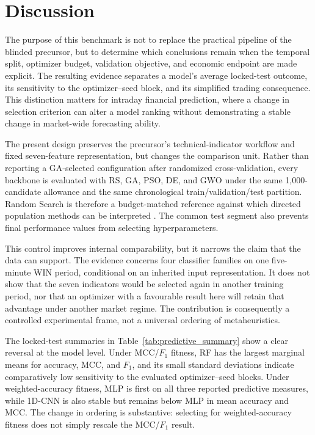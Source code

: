 \section{Discussion}\label{sec:discussion}

The purpose of this benchmark is not to replace the practical pipeline of the blinded precursor, but to determine which conclusions remain when the temporal split, optimizer budget, validation objective, and economic endpoint are made explicit. The resulting evidence separates a model's average locked-test outcome, its sensitivity to the optimizer--seed block, and its simplified trading consequence. This distinction matters for intraday financial prediction, where a change in selection criterion can alter a model ranking without demonstrating a stable change in market-wide forecasting ability.

The present design preserves the precursor's technical-indicator workflow and fixed seven-feature representation, but changes the comparison unit. Rather than reporting a GA-selected configuration after randomized cross-validation, every backbone is evaluated with RS, GA, PSO, DE, and GWO under the same 1,000-candidate allowance and the same chronological train/validation/test partition. Random Search is therefore a budget-matched reference against which directed population methods can be interpreted \cite{bergstra2012random_search}. The common test segment also prevents final performance values from selecting hyperparameters.

This control improves internal comparability, but it narrows the claim that the data can support. The evidence concerns four classifier families on one five-minute WIN period, conditional on an inherited input representation. It does not show that the seven indicators would be selected again in another training period, nor that an optimizer with a favourable result here will retain that advantage under another market regime. The contribution is consequently a controlled experimental frame, not a universal ordering of metaheuristics.


The locked-test summaries in Table~\ref{tab:predictive_summary} show a clear reversal at the model level. Under MCC/$F_1$ fitness, RF has the largest marginal means for accuracy, MCC, and $F_1$, and its small standard deviations indicate comparatively low sensitivity to the evaluated optimizer--seed blocks. Under weighted-accuracy fitness, MLP is first on all three reported predictive measures, while 1D-CNN is also stable but remains below MLP in mean accuracy and MCC. The change in ordering is substantive: selecting for weighted-accuracy fitness does not simply rescale the MCC/$F_1$ result.

